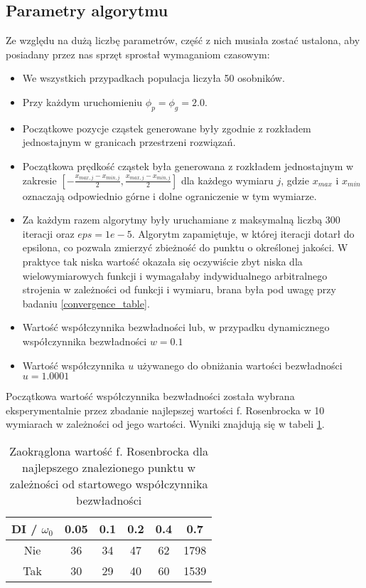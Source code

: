 \documentclass[12pt]{article}
\begin{document}
\subsection{Parametry algorytmu}
Ze względu na dużą liczbę parametrów, część z nich musiała zostać ustalona, aby posiadany przez nas sprzęt sprostał wymaganiom czasowym:

\begin{itemize}
	\item We wszystkich przypadkach populacja liczyła 50 osobników.
	\item Przy każdym uruchomieniu $\phi_p = \phi_g = 2.0$.
	\item Początkowe pozycje cząstek generowane były zgodnie z rozkładem jednostajnym w granicach przestrzeni rozwiązań.
	\item Początkowa prędkość cząstek była generowana z rozkładem jednostajnym w zakresie $[-\frac{x_{max, j}-x_{min, j}}{2}, \frac{x_{max, j}-x_{min, j}}{2}]$ dla każdego wymiaru \(j\), gdzie $x_{max}$ i $x_{min}$ oznaczają odpowiednio
	      górne i dolne ograniczenie w tym wymiarze.
	\item Za każdym razem algorytmy były uruchamiane z maksymalną liczbą 300 iteracji oraz $eps = 1e-5$. Algorytm zapamiętuje,
	      w której iteracji dotarł do epsilona, co pozwala zmierzyć zbieżność do punktu o określonej jakości. W praktyce tak niska
	      wartość okazała się oczywiście zbyt niska dla wielowymiarowych funkcji i wymagałaby indywidualnego arbitralnego strojenia
	      w zależności od funkcji i wymiaru, brana była pod uwagę przy badaniu \ref{convergence_table}.
	\item Wartość współczynnika bezwładności lub, w przypadku dynamicznego współczynnika bezwładności $w = 0.1$
	\item Wartość współczynnika $u$ używanego do obniżania wartości bezwładności $u = 1.0001$
\end{itemize}

Początkowa wartość współczynnika bezwładności została wybrana eksperymentalnie przez zbadanie najlepszej wartości f. Rosenbrocka w 10 wymiarach w zależności od
jego wartości. Wyniki znajdują się w tabeli \ref{tab:test_rosenbrock}.

\begin{table}[h]
	\centering
	\begin{tabular}{|c|c|c|c|c|c|}
		\hline
		DI / $\omega_0$ & 0.05 & 0.1 & 0.2 & 0.4 & 0.7  \\
		\hline
		Nie             & 36   & 34  & 47  & 62  & 1798 \\
		Tak             & 30   & 29  & 40  & 60  & 1539 \\
		\hline
	\end{tabular}
	\caption{Zaokrąglona wartość f. Rosenbrocka dla najlepszego znalezionego punktu w zależności od startowego współczynnika bezwładności}
	\label{tab:test_rosenbrock}
\end{table}
\end{document}
